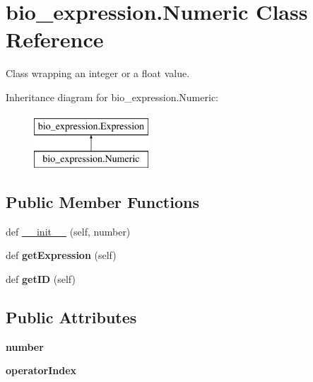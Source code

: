 \hypertarget{classbio__expression_1_1_numeric}{}\section{bio\+\_\+expression.\+Numeric Class Reference}
\label{classbio__expression_1_1_numeric}


Class wrapping an integer or a float value.  


Inheritance diagram for bio\+\_\+expression.\+Numeric\+:\begin{figure}[H]
\begin{center}
\leavevmode
\includegraphics[height=2.000000cm]{classbio__expression_1_1_numeric}
\end{center}
\end{figure}
\subsection*{Public Member Functions}
\begin{DoxyCompactItemize}
\item 
def \hyperlink{classbio__expression_1_1_numeric_a23edeb04b927bd1a4fb20f1db42ac5cc}{\+\_\+\+\_\+init\+\_\+\+\_\+} (self, number)
\item 
def {\bfseries get\+Expression} (self)\hypertarget{classbio__expression_1_1_numeric_af95dad149c8fe5d88d4c3ab8df977e47}{}\label{classbio__expression_1_1_numeric_af95dad149c8fe5d88d4c3ab8df977e47}

\item 
def {\bfseries get\+ID} (self)\hypertarget{classbio__expression_1_1_numeric_ae07dd75c7c3dacf5a9b43aa996a54c4b}{}\label{classbio__expression_1_1_numeric_ae07dd75c7c3dacf5a9b43aa996a54c4b}

\end{DoxyCompactItemize}
\subsection*{Public Attributes}
\begin{DoxyCompactItemize}
\item 
{\bfseries number}\hypertarget{classbio__expression_1_1_numeric_a61e657d4d757ba789c0e858d4f71d197}{}\label{classbio__expression_1_1_numeric_a61e657d4d757ba789c0e858d4f71d197}

\item 
{\bfseries operator\+Index}\hypertarget{classbio__expression_1_1_numeric_a2536119ab49b2aefa2241202b0d73b19}{}\label{classbio__expression_1_1_numeric_a2536119ab49b2aefa2241202b0d73b19}

\end{DoxyCompactItemize}


